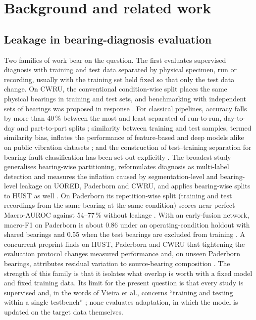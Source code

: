 \section{Background and related work}
\label{sec:background}

\subsection{Leakage in bearing-diagnosis evaluation}

Two families of work bear on the question. The first evaluates supervised diagnosis with training and test data
separated by physical specimen, run or recording, usually with the training set held fixed so that only the test data
change. On CWRU, the conventional condition-wise split places the same physical bearings in training and test sets, and
benchmarking with independent sets of bearings was proposed in response \cite{hendriks2022}. For classical pipelines,
accuracy falls by more than 40\,\% between the most and least separated of run-to-run, day-to-day and part-to-part splits
\cite{wheat2024leakage}; similarity between training and test samples, termed similarity bias, inflates the performance of
feature-based and deep models alike on public vibration datasets \cite{varejao2025similarity}; and the construction of
test--training separation for bearing fault classification has been set out explicitly \cite{matania2024leakage}. The
broadest study generalises bearing-wise partitioning, reformulates diagnosis as multi-label detection and measures the
inflation caused by segmentation-level and bearing-level leakage on UORED, Paderborn and CWRU, and applies bearing-wise splits to HUST as well \cite{vieira2026}. On
Paderborn its repetition-wise split (training and test recordings from the same bearing at the same condition) scores
near-perfect Macro-AUROC against 54--77\,\% without leakage \cite[Table~12]{vieira2026}. With an early-fusion network,
macro-F1 on Paderborn is about 0.86 under an operating-condition holdout with shared bearings and 0.55 when the test bearings are excluded from training \cite{kaya2026}. A concurrent preprint finds on HUST, Paderborn and CWRU that tightening the evaluation protocol changes measured performance and, on unseen Paderborn bearings, attributes residual variation to source-bearing composition \cite{lei2026srt}. The strength of
this family is that it isolates what overlap is worth with a fixed model and fixed training data. Its limit for the present
question is that every study is supervised and, in the words of Vieira et al., concerns ``training and testing within a
single testbench'' \cite{vieira2026}; none evaluates adaptation, in which the model is updated on the target data
themselves.

